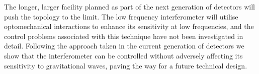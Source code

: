 The longer, larger \ET{} facility planned as part of the next generation of detectors will push the \MI{} topology to the limit. The low frequency interferometer will utilise optomechanical interactions to enhance its sensitivity at low frequencies, and the control problems associated with this technique have not been investigated in detail. Following the approach taken in the current generation of detectors we show that the interferometer can be controlled without adversely affecting its sensitivity to gravitational waves, paving the way for a future technical design.